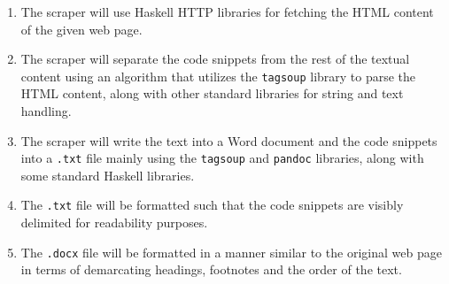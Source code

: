\documentclass{scrreprt}
\begin{document}
\begin{enumerate}
    \item The scraper will use Haskell HTTP libraries for fetching the HTML content of the given web page.
    \item The scraper will separate the code snippets from the rest of the textual content using an algorithm that utilizes the \texttt{tagsoup} library to parse the HTML content, along with other standard libraries for string and text handling.
    \item The scraper will write the text into a Word document and the code snippets into a \texttt{.txt} file mainly using the \texttt{tagsoup} and \texttt{pandoc} libraries, along with some standard Haskell libraries.
    \item The \texttt{.txt} file will be formatted such that the code snippets are visibly delimited for readability purposes.
    \item The \texttt{.docx} file will be formatted in a manner similar to the original web page in terms of demarcating headings, footnotes and the order of the text. 
\end{enumerate}




\end{document}

